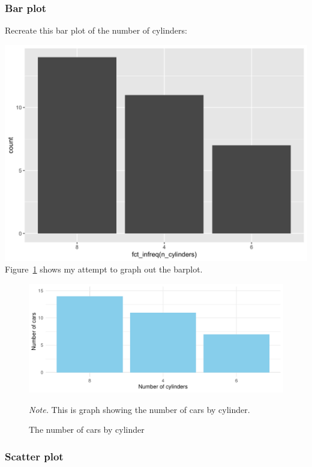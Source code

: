 \documentclass[
  man,
  floatsintext,
  longtable,
  nolmodern,
  notxfonts,
  notimes,
  colorlinks=true,linkcolor=blue,citecolor=blue,urlcolor=blue]{apa7}
\begin{document}
\subsubsection{Bar plot}\label{bar-plot}

Recreate this bar plot of the number of cylinders:

\includegraphics{plots/plot2.png} Figure~\ref{fig-plot2-barplot} shows
my attempt to graph out the barplot.

\begin{figure}[H]

{\caption{{The number of cars by cylinder}{\label{fig-plot2-barplot}}}}

\includegraphics{data-visualization_files/figure-pdf/fig-plot2-barplot-1.pdf}

{\noindent \emph{Note.} This is graph showing the number of cars by
cylinder.}

\end{figure}

\subsubsection{Scatter plot}\label{scatter-plot}
\end{document}
